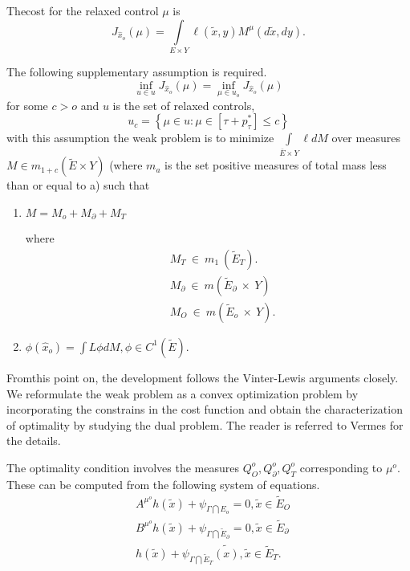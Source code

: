 The\pageoriginale cost for the relaxed control $\mu$ is 
$$
J_{\hat{x}_o} (\mu) = \int\limits_{E \times Y} \ell (\tilde{x},
y)M^\mu(d \tilde{x}, dy). 
$$

The following supplementary assumption is required. 
$$
\inf_{u \in  u} J_{\hat{x}_o} (\mu) = \inf\limits_{\mu
  \in  u_o} J_{\hat{x}_o} (\mu) 
$$
for some $c>o$ and $u$ is the set of relaxed controls,
$$
u_c= \left\{\mu \in  u: \mu \in  [\tau+ p^*_\tau] \le c\right\}
$$
with this assumption the weak problem is to minimize
$\int\limits_{\bar{E} \times Y}{\ell dM}$ over measures $M \in 
m_{1+c}(\tilde{E} \times Y)$  (where $m_a$ is the set positive
measures of total mass less than or equal to a) such that 
\begin{enumerate}
\item $M = M_o +  M_\partial + M_T$

  where
  \vskip -1.4cm 
  \begin{align*}
    &M_T~ \in ~ m_1~ (\tilde{E}_T).\\
    &M_\partial~ \in ~ m(\tilde{E}_\partial ~\times~ Y)\\
    &M_O~ \in  ~m(\tilde{E}_o ~\times ~Y).
  \end{align*}

\item $\phi(\hat{x}_o)  = \int L \phi dM, \phi \in  C^1 (\tilde{E})$.
\end{enumerate} 
 
 From\pageoriginale this point on, the development follows the Vinter-Lewis
 arguments closely. We reformulate the weak problem as a convex
 optimization problem by incorporating the constrains in the cost
 function and obtain the characterization of optimality by studying
 the dual problem. The reader is referred to Vermes \cite{key25} for
 the  details.  
 
 \begin{rem}%
   The optimality condition involves the measures $Q^o_O,
   Q^o_\partial, Q^o_T$ corresponding to $\mu^o$. These can be
   computed from the following system of equations. 
 \begin{align*}
   & A^{\mu^o}h(\tilde{x})+ \psi_{\Gamma \bigcap E_o} = 0, \tilde{x}
     \in  \tilde{E}_O\\ 
   & B^{\mu^o}h(\tilde{x})+ \psi_{\Gamma \bigcap \tilde{E}_\partial} = 0,
     \tilde{x} \in  \tilde{E}_\partial\\ 
   & h(\tilde{x})+ \psi_{\Gamma \bigcap \tilde{E}_T}
     \tilde{(x)}, \tilde{x} \in  \tilde{E}_T.\\ 
 \end{align*} 
 \end{rem}

